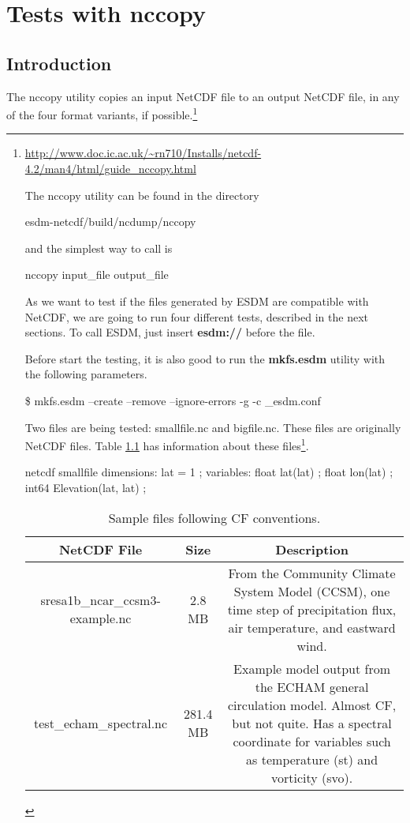 \chapter{Tests with nccopy}
\label{ch:nccopy}

\section{Introduction}

\tab
The nccopy utility copies an input NetCDF file to an output NetCDF file, in any of the four format variants, if possible.\footnote{\url{http://www.doc.ic.ac.uk/~rn710/Installs/netcdf-4.2/man4/html/guide_nccopy.html}

The nccopy utility can be found in the directory

\begin{framed}
esdm-netcdf/build/ncdump/nccopy
\end{framed}

and the simplest way to call is

\begin{framed}
nccopy input\_file output\_file
\end{framed}

As we want to test if the files generated by ESDM are compatible with NetCDF, we are going to run four different tests, described in the next sections. To call ESDM, just insert \textbf{esdm://} before the file.

Before start the testing, it is also good to run the \textbf{mkfs.esdm} utility with the following parameters.

\begin{framed}
\$ mkfs.esdm --create --remove --ignore-errors -g -c \_esdm.conf
\end{framed}

Two files are being tested: smallfile.nc and bigfile.nc. These files are originally NetCDF files. Table \ref{tab:netcdf} has information about these files\footnote{\url{https://www.unidata.ucar.edu/software/netcdf/examples/files.html}}.

netcdf smallfile {
dimensions:
	lat = 1 ;
variables:
	float lat(lat) ;
	float lon(lat) ;
	int64 Elevation(lat, lat) ;
}

\begin{table}[H]
\centering
\begin{tabular}{|c|c|c|}
\hline
\multicolumn{1}{|c|}{NetCDF File}	& \multicolumn{1}{|c|}{Size} & \multicolumn{1}{|c|}{Description} \\ \hline \hline
sresa1b\_ncar\_ccsm3-example.nc & 2.8 MB & From the Community Climate System Model (CCSM), one time step of precipitation flux, air temperature, and eastward wind. \\ \hline
test\_echam\_spectral.nc & 281.4 MB & Example model output from the ECHAM general circulation model. Almost CF, but not quite. Has a spectral coordinate for variables such as temperature (st) and vorticity (svo). \\ \hline
\hline
\end{tabular}
\caption{\label{tab:netcdf} Sample files following CF conventions.}
\end{table}

}
